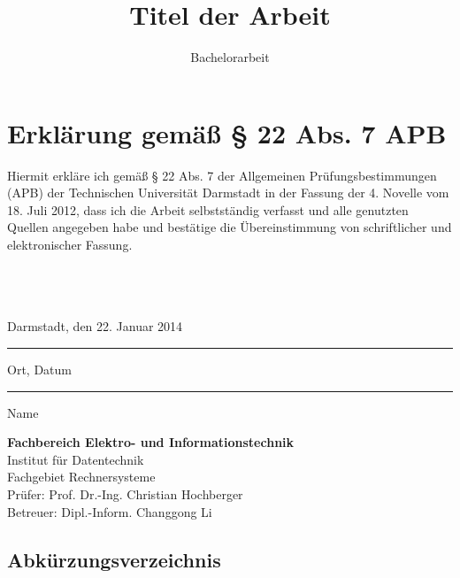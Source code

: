 \documentclass[accentcolor=tud1c,colorback,ngerman,12pt] {tudreport}
\begin{document}
\title{Titel der Arbeit}
\subtitle{Bachelorarbeit}

\maketitle
\chapter*{Erklärung gemäß § 22 Abs. 7 APB}

Hiermit erkläre ich gemäß § 22 Abs. 7 der Allgemeinen Prüfungsbestimmungen (APB) der Technischen Universität Darmstadt in der Fassung der 4. Novelle vom 18. Juli 2012, dass ich die Arbeit selbstständig verfasst und alle genutzten Quellen angegeben habe und bestätige die Übereinstimmung von schriftlicher und elektronischer Fassung.\\ \\ \\ \\

\parbox{8cm}{\centering Darmstadt, den 22. Januar 2014\hrule
\strut \centering\footnotesize Ort, Datum} \hfill\parbox{8cm}{\phantom{Darmstadt, den 22. Januar 2014} \hrule
\strut \centering\footnotesize Name}

\vfill

\noindent \textbf{Fachbereich Elektro- und Informationstechnik}\\
Institut für Datentechnik\\
Fachgebiet Rechnersysteme\\
Prüfer: Prof. Dr.-Ing. Christian Hochberger\\
Betreuer: Dipl.-Inform. Changgong Li

\tableofcontents








\section*{Abkürzungsverzeichnis}
\begin{acronym}




\end{acronym}
\end{document}
